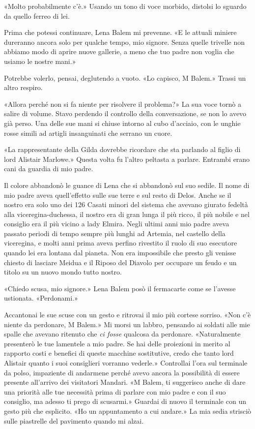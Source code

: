 «Molto probabilmente c'è.» Usando un tono di voce morbido, distolsi lo
sguardo da quello ferreo di lei.

Prima che potessi continuare, Lena Balem mi prevenne. «E le attuali
miniere dureranno ancora solo per qualche tempo, mio signore. Senza
quelle trivelle non abbiamo modo di aprire nuove gallerie, a meno che
tuo padre non voglia che usiamo le nostre mani.»

Potrebbe volerlo, pensai, deglutendo a vuoto. «Lo capisco, M Balem.»
Trassi un altro respiro.

«Allora perché non si fa niente per risolvere il problema?» La sua voce
tornò a salire di volume. Stavo perdendo il controllo della
conversazione, se non lo avevo già perso. Una delle sue mani si chiuse
intorno al cubo d'acciaio, con le unghie rosse simili ad artigli
insanguinati che serrano un cuore.

«La rappresentante della Gilda dovrebbe ricordare che sta parlando al
figlio di lord Alistair Marlowe.» Questa volta fu l'altro peltasta a
parlare. Entrambi erano cani da guardia di mio padre.

Il colore abbandonò le guance di Lena che si abbandonò sul suo sedile.
Il nome di mio padre aveva quell'effetto sulle sue terre e sul resto di
Delos. Anche se il nostro era solo uno dei 126 Casati minori del sistema
che avevano giurato fedeltà alla viceregina-duchessa, il nostro era di
gran lunga il più ricco, il più nobile e nel consiglio era il più vicino
a lady Elmira. Negli ultimi anni mio padre aveva passato periodi di
tempo sempre più lunghi ad Artemia, nel castello della viceregina, e
molti anni prima aveva perfino rivestito il ruolo di suo esecutore
quando lei era lontana dal pianeta. Non era impossibile che presto gli
venisse chiesto di lasciare Meidua e il Riposo del Diavolo per occupare
un feudo e un titolo su un nuovo mondo tutto nostro.

«Chiedo scusa, mio signore.» Lena Balem posò il fermacarte come se
l'avesse ustionata. «Perdonami.»

Accantonai le sue scuse con un gesto e ritrovai il mio più cortese
sorriso. «Non c'è niente da perdonare, M Balem.» Mi morsi un labbro,
pensando ai soldati alle mie spalle che avevano ritenuto che \emph{ci
	fosse} qualcosa da perdonare. «Naturalmente presenterò le tue lamentele
a mio padre. Se hai delle proiezioni in merito al rapporto costi e
benefici di queste macchine sostitutive, credo che tanto lord Alistair
quanto i suoi consiglieri vorranno vederle.» Controllai l'ora sul
terminale da polso, impaziente di andarmene perché avevo ancora la
possibilità di essere presente all'arrivo dei visitatori Mandari. «M
Balem, ti suggerisco anche di dare una priorità alle tue necessità prima
di parlare con mio padre e con il suo consiglio, ma adesso ti prego di
scusarmi.» Guardai di nuovo il terminale con un gesto più che esplicito.
«Ho un appuntamento a cui andare.» La mia sedia strisciò sulle
piastrelle del pavimento quando mi alzai.

